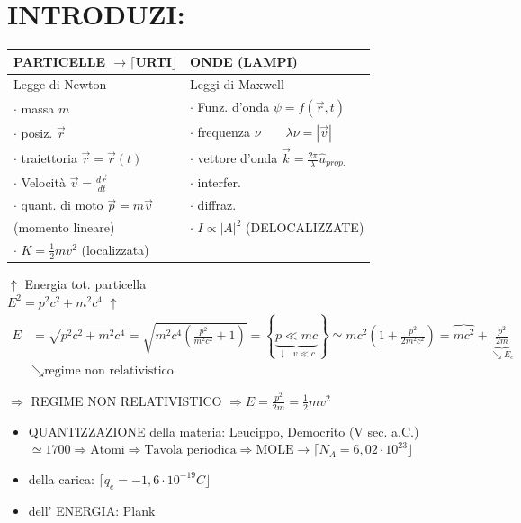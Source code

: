 \documentclass[12pt,a4paper]{article}
\begin{document}
\section*{INTRODUZI:}

\begin{table}[H]
    \centering
    \renewcommand{\arraystretch}{1.5}
    \begin{tabular}{ll}
        \textbf{PARTICELLE $\rightarrow \lceil$URTI$\rfloor$} & \textbf{ONDE (LAMPI)} \\
        \midrule
        Legge di Newton & Leggi di Maxwell \\
        $\cdot$ massa $m$ & $\cdot$ Funz. d'onda $\psi = f(\vec{r}, t)$ \\
        $\cdot$ posiz. $\vec{r}$ & $\cdot$ frequenza $\nu \qquad \lambda\nu = |\vec{v}|$ \\
        $\cdot$ traiettoria $\vec{r} = \vec{r}(t)$ & $\cdot$ vettore d'onda $\vec{k} = \frac{2\pi}{\lambda}\hat{u}_{prop.}$ \\
        $\cdot$ Velocità $\vec{v} = \frac{d\vec{r}}{dt}$ & $\cdot$ interfer. \\
        $\cdot$ quant. di moto $\vec{p} = m\vec{v}$ & $\cdot$ diffraz. \\
        \quad (momento lineare) & $\cdot$ $I \propto |A|^2$ (DELOCALIZZATE) \\
        $\cdot$ $K = \frac{1}{2}mv^2$ (localizzata) & \\
    \end{tabular}
\end{table}

\vspace{0.5cm}
\noindent $\uparrow$ Energia tot. particella \hfill {} \\
$E^2 = p^2c^2 + m^2c^4$ \hfill $\uparrow$ 
\begin{align*}
    E &= \sqrt{p^2c^2 + m^2c^4} = \sqrt{m^2c^4 \left( \frac{p^2}{m^2c^2} + 1 \right)} = \left\{ \underbrace{p \ll mc}_{\downarrow \text{ } v \ll c} \right\} \simeq m c^2 \left( 1 + \frac{p^2}{2m^2c^2} \right) = \overbrace{mc^2} + \underbrace{\frac{p^2}{2m}}_{\searrow E_c} \\
    & \searrow \text{regime non relativistico}
\end{align*}

$\Rightarrow$ REGIME NON RELATIVISTICO $\Rightarrow E = \frac{p^2}{2m} = \frac{1}{2}mv^2$

\vspace{0.5cm}
\begin{itemize}
    \item QUANTIZZAZIONE della materia: Leucippo, Democrito (V sec. a.C.) \\
    $\simeq 1700 \Rightarrow \text{Atomi} \Rightarrow \text{Tavola periodica} \Rightarrow \text{MOLE} \rightarrow \lceil N_A = 6,02 \cdot 10^{23} \rfloor$
    
    \item \hphantom{QUANTIZZAZIONE} della carica: $\lceil q_e = -1,6 \cdot 10^{-19} C \rfloor$
    
    \item \hphantom{QUANTIZZAZIONE} dell' ENERGIA: Plank
\end{itemize}
\end{document}
